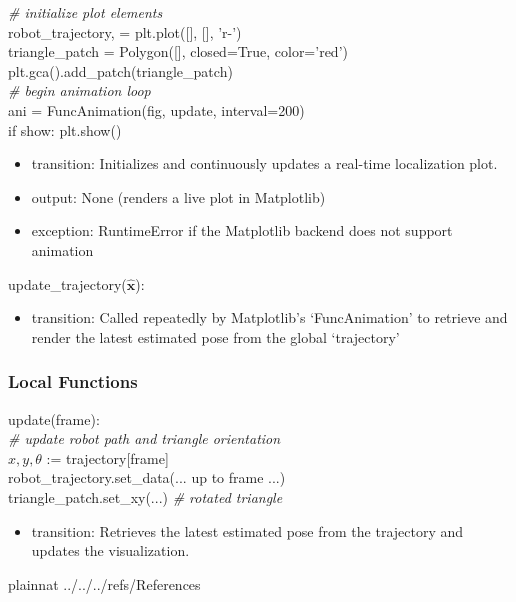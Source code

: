 \documentclass[12pt, titlepage]{article}
\begin{document}
\noindent \textit{\# initialize plot elements} \\
robot\_trajectory, = plt.plot([], [], 'r-') \\
triangle\_patch = Polygon([], closed=True, color='red') \\
plt.gca().add\_patch(triangle\_patch) \\

\noindent \textit{\# begin animation loop} \\
ani = FuncAnimation(fig, update, interval=200) \\
if show: plt.show()

\begin{itemize}
  \item transition: Initializes and continuously updates a real-time localization plot.
  \item output: None (renders a live plot in Matplotlib)
  \item exception: RuntimeError if the Matplotlib backend does not support animation
\end{itemize}

\noindent update\_trajectory($\hat{\mathbf{x}}$):
\begin{itemize}
\item transition: Called repeatedly by Matplotlib's `FuncAnimation' to retrieve and render the latest estimated pose from the global `trajectory'
\end{itemize}



\subsubsection{Local Functions}
\noindent update(frame):\\
\noindent \textit{\# update robot path and triangle orientation} \\
$x, y, \theta$ := trajectory[frame] \\
robot\_trajectory.set\_data(... up to frame ...) \\
triangle\_patch.set\_xy(...) \textit{\# rotated triangle}

\begin{itemize}
    \item transition: Retrieves the latest estimated pose from the trajectory and updates the visualization.
\end{itemize}

\newpage


 {plainnat}
 {../../../refs/References}






\end{document}
